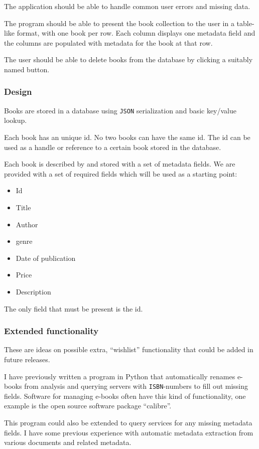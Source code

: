 The application should be able to handle common user errors and missing data.

The program should be able to present the book collection to the user in a
table-like format, with one book per row. Each column displays one metadata
field and the columns are populated with metadata for the book at that row.

The user should be able to delete books from the database by clicking a
suitably named button.


\subsubsection{Design}
Books are stored in a database using \texttt{JSON} serialization and basic
key/value lookup.

Each book has an unique id. No two books can have the same id.  The id can be
used as a handle or reference to a certain book stored in the database.

Each book is described by and stored with a set of metadata fields.  We are
provided with a set of required fields which will be used as a starting point:

\begin{itemize}
  \item Id
  \item Title
  \item Author
  \item genre
  \item Date of publication
  \item Price
  \item Description
\end{itemize}

The only field that must be present is the id.


\subsubsection{Extended functionality}
These are ideas on possible extra, ``wishlist'' functionality that could be
added in future releases.

I have previously written a program in Python that automatically renames e-books
from analysis and querying servers with \texttt{ISBN}-numbers to fill out
missing fields. Software for managing e-books often have this kind of
functionality, one example is the open source software package
``calibre''\cite{calibre}.

This program could also be extended to query services for any missing metadata
fields. I have some previous experience with automatic metadata extraction from
various documents and related metadata.

